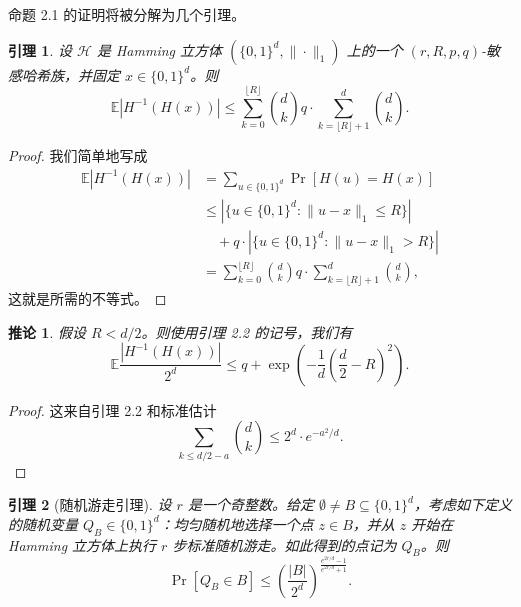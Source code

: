 \documentclass[10pt,twocolumn]{ctexart}
\newtheorem{lemma}{引理}
\newtheorem{corollary}{推论}
\begin{document}
命题 2.1 的证明将被分解为几个引理。

\begin{lemma}
设 $\mathcal{H}$ 是 Hamming 立方体 $(\{0,1\}^d,\|\cdot\|_1)$ 上的一个 $(r,R,p,q)$-敏感哈希族，并固定 $x\in\{0,1\}^d$。则
\[
\mathbb{E}\left|H^{-1}(H(x))\right|
\le
\sum_{k=0}^{\lfloor R\rfloor}\binom{d}{k}
q\cdot
\sum_{k=\lfloor R\rfloor+1}^{d}\binom{d}{k}.
\]
\end{lemma}

\begin{proof}
我们简单地写成
\[
\begin{aligned}
\mathbb{E}\left|H^{-1}(H(x))\right|
&=\sum_{u\in\{0,1\}^d}\Pr[H(u)=H(x)]\\
&\le
\left|\{u\in\{0,1\}^d:\|u-x\|_1\le R\}\right|\\
&\quad+
q\cdot
\left|\{u\in\{0,1\}^d:\|u-x\|_1>R\}\right|\\
&=
\sum_{k=0}^{\lfloor R\rfloor}\binom{d}{k}
q\cdot
\sum_{k=\lfloor R\rfloor+1}^{d}\binom{d}{k},
\end{aligned}
\]
这就是所需的不等式。
\end{proof}

\begin{corollary}
假设 $R<d/2$。则使用引理 2.2 的记号，我们有
\[
\mathbb{E}\frac{\left|H^{-1}(H(x))\right|}{2^d}
\le
q+\exp\left(-\frac{1}{d}\left(\frac{d}{2}-R\right)^2\right).
\]
\end{corollary}

\begin{proof}
这来自引理 2.2 和标准估计
\[
\sum_{k\le d/2-a}\binom{d}{k}\le 2^d\cdot e^{-a^2/d}.
\]
\end{proof}

\begin{lemma}[随机游走引理]
设 $r$ 是一个奇整数。给定 $\emptyset\ne B\subseteq\{0,1\}^d$，考虑如下定义的随机变量 $Q_B\in\{0,1\}^d$：均匀随机地选择一个点 $z\in B$，并从 $z$ 开始在 Hamming 立方体上执行 $r$ 步标准随机游走。如此得到的点记为 $Q_B$。则
\[
\Pr[Q_B\in B]\le
\left(\frac{|B|}{2^d}\right)^{
\frac{e^{2r/d}-1}{e^{2r/d}+1}
}.
\]
\end{lemma}
\end{document}

